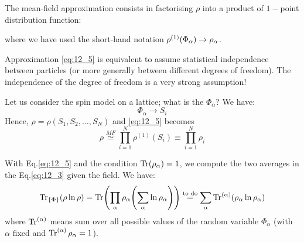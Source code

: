 \documentclass[../main/main.tex]{subfiles}
\begin{document}
The mean-field approximation consists in factorising \( \rho  \) into a product of \( 1- \)point distribution function:
where we have used the short-hand notation \(  \rho^{(1)}\qty(\Phi _ \alpha ) \rightarrow  \rho _ \alpha \).
\begin{remark}
Approximation \eqref{eq:12_5} is equivalent to assume statistical independence between particles (or more generally between different degrees of freedom). The independence of the degree of freedom is a very strong assumption!
\end{remark}
\begin{example}{}{}
Let us consider the spin model on a lattice; what is the \( \Phi _ \alpha  \)? We have:
\begin{equation*}
   \Phi _ \alpha  \rightarrow S_i
\end{equation*}
Hence, \( \rho = \rho (S_1,S_2, \dots, S_N) \) and \eqref{eq:12_5} becomes
\begin{equation*}
  \rho \overset{MF}{\simeq } \prod_{i =1}^{N} \rho ^{(1)} (S_i) \equiv \prod_{i =1}^{N} \rho_ i
\end{equation*}
\end{example}

With Eq.\eqref{eq:12_5} and the condition \( \Tr(\rho _ \alpha ) =1 \), we compute the two averages in the Eq.\eqref{eq:12_3} given the field. We have:
\begin{equation}
  \Tr_{\{ \Phi  \}  } ( \rho \ln{\rho } ) = \Tr(\prod_{\alpha }^{} \rho _ \alpha  \qty( \sum_{\alpha }^{} \ln{\rho _ \alpha }  ) ) \overset{\text{to do}}{=} \sum_{\alpha }^{}
  \Tr^{(\alpha )}(\rho _ \alpha  \ln{\rho _ \alpha } )
\end{equation}
where \( \Tr^{(\alpha )} \) means sum over all possible values of the random variable \( \Phi _ \alpha  \) (with \( \alpha  \) fixed and \( \Tr^{(\alpha )} \rho _ \alpha = 1 \)).
\end{document}
